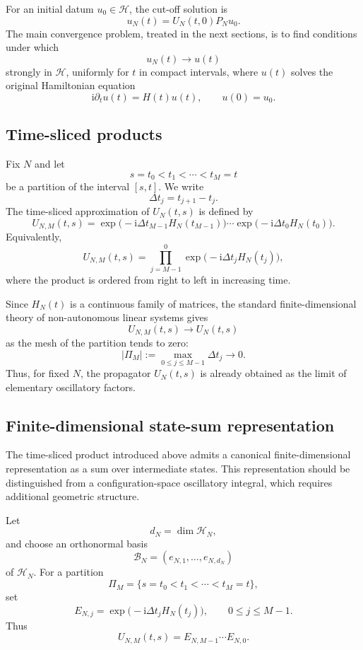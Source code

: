 \documentclass[11pt]{amsart}
\theoremstyle{plain}
\theoremstyle{definition}
\theoremstyle{remark}
\newcommand{\Hilb}{\mathcal H}
\newcommand{\ii}{\mathrm i}
\begin{document}
For an initial datum \(u_0\in\Hilb\), the cut-off solution is
\[
        u_N(t)=U_N(t,0)P_Nu_0.
\]
The main convergence problem, treated in the next sections, is to find
conditions under which
\[
        u_N(t)\longrightarrow u(t)
\]
strongly in \(\Hilb\), uniformly for \(t\) in compact intervals, where
\(u(t)\) solves the original Hamiltonian equation
\[
        \ii\partial_t u(t)=H(t)u(t),
        \qquad
        u(0)=u_0.
\]

\subsection{Time-sliced products}

Fix \(N\) and let
\[
        s=t_0<t_1<\cdots<t_M=t
\]
be a partition of the interval \([s,t]\).  We write
\[
        \Delta t_j=t_{j+1}-t_j.
\]
The time-sliced approximation of \(U_N(t,s)\) is defined by
\[
        U_{N,M}(t,s)
        =
        \exp\big(-\ii\Delta t_{M-1}H_N(t_{M-1})\big)
        \cdots
        \exp\big(-\ii\Delta t_0H_N(t_0)\big).
\]
Equivalently,
\[
        U_{N,M}(t,s)
        =
        \prod_{j=M-1}^{0}
        \exp\big(-\ii\Delta t_jH_N(t_j)\big),
\]
where the product is ordered from right to left in increasing time.

Since \(H_N(t)\) is a continuous family of matrices, the standard
finite-dimensional theory of non-autonomous linear systems gives
\[
        U_{N,M}(t,s)\longrightarrow U_N(t,s)
\]
as the mesh of the partition tends to zero:
\[
        |\Pi_M|
        :=
        \max_{0\leq j\leq M-1}\Delta t_j
        \longrightarrow0.
\]
Thus, for fixed \(N\), the propagator \(U_N(t,s)\) is already obtained
as the limit of elementary oscillatory factors.

\subsection{Finite-dimensional state-sum representation}
\label{subsec:finite-dimensional-state-sum}

The time-sliced product introduced above admits a canonical finite-dimensional
representation as a sum over intermediate states. This representation should
be distinguished from a configuration-space oscillatory integral, which
requires additional geometric structure.

Let
\[
d_{N}=\dim\mathcal{H}_{N},
\]
and choose an orthonormal basis
\[
\mathcal{B}_{N}=(e_{N,1},\ldots,e_{N,d_{N}})
\]
of \(\mathcal{H}_{N}\). For a partition
\[
\Pi_{M}=\{s=t_{0}<t_{1}<\cdots<t_{M}=t\},
\]
set
\[
E_{N,j}
=
\exp\bigl(-\mathrm{i}\Delta t_{j}H_{N}(t_{j})\bigr),
\qquad
0\leq j\leq M-1.
\]
Thus
\[
U_{N,M}(t,s)
=
E_{N,M-1}\cdots E_{N,0}.
\]
\end{document}
